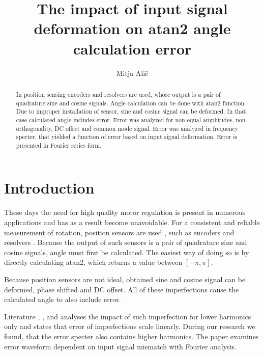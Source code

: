 \documentclass[a4paper]{article}
\begin{document}
\title{The impact of input signal deformation on atan2 angle calculation error}
\author{Mitja Alič}
\maketitle

\begin{abstract}{}
In position sensing encoders and resolvers are used, whose output is a pair of quadrature sine and cosine signals. Angle calculation can be done with atan2 function. Due to improper installation of sensor, sine and cosine signal can be deformed. In that case calculated angle includes error. Error was analyzed for non-equal amplitudes, non-orthogonality, DC offset and common mode signal. Error was analyzed in frequency specter, that yielded a function of error based on input signal deformation. Error is presented in Fourier series form.
\end{abstract}


\section{Introduction}
These days the need for high quality motor regulation is present in numerous applications and has as a result become unavoidable. For a consistent and reliable measurement of rotation, position sensors are used \cite{uporaba_senzorjev}, such as encoders and resolvers \cite{inkrementalni}\cite{resolver}\cite{enkoder}. Because the output of such sensors is a pair of quadrature sine and cosine signals, angle must first be calculated. The easiest way of doing so is by directly calculating atan2, which returns a value between $[-\pi, \pi]$.

Because position sensors are not ideal, obtained sine and cosine signal can be deformed, phase shifted and DC offset. All of these imperfections cause the calculated angle to also include error.

Literature  \cite{orbis}, \cite{RLS1}, \cite{RLS2} and \cite{RLS3} analyses the impact of such imperfection for lower harmonics only and states that error of imperfections scale linearly. During our research we found, that the error specter also contains higher harmonics. The paper examines error waveform dependent on input signal mismatch with Fourier analysis. 
\end{document}

